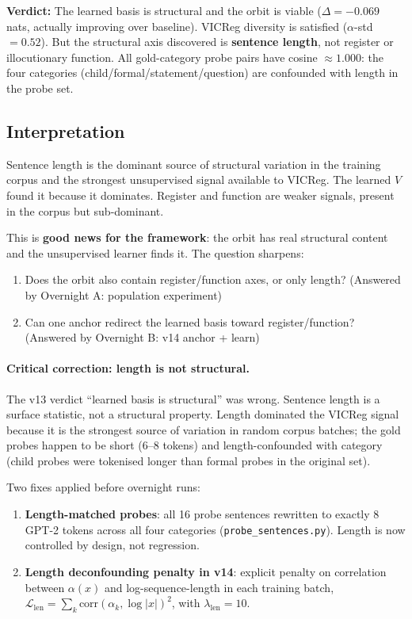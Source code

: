 \documentclass[11pt, a4paper]{article}
\theoremstyle{plain}
\theoremstyle{definition}
\theoremstyle{remark}
\begin{document}
\noindent\textbf{Verdict:} The learned basis is structural and the orbit is viable
($\Delta = -0.069$ nats, actually improving over baseline). VICReg diversity
is satisfied ($\alpha$-std $= 0.52$). But the structural axis discovered is
\textbf{sentence length}, not register or illocutionary function.
All gold-category probe pairs have cosine $\approx 1.000$: the four categories
(child/formal/statement/question) are confounded with length in the probe set.

\subsection{Interpretation}

Sentence length is the dominant source of structural variation in the training corpus
and the strongest unsupervised signal available to VICReg.
The learned $V$ found it because it dominates.
Register and function are weaker signals, present in the corpus but sub-dominant.

This is \textbf{good news for the framework}: the orbit has real structural content
and the unsupervised learner finds it. The question sharpens:
\begin{enumerate}[nosep]
\item Does the orbit also contain register/function axes, or only length?
      (Answered by Overnight A: population experiment)
\item Can one anchor redirect the learned basis toward register/function?
      (Answered by Overnight B: v14 anchor + learn)
\end{enumerate}

\paragraph{Critical correction: length is not structural.}
The v13 verdict ``learned basis is structural'' was wrong.
Sentence length is a surface statistic, not a structural property.
Length dominated the VICReg signal because it is the strongest source of variation
in random corpus batches; the gold probes happen to be short (6--8 tokens) and
length-confounded with category (child probes were tokenised longer than formal
probes in the original set).

Two fixes applied before overnight runs:
\begin{enumerate}[nosep]
\item \textbf{Length-matched probes}: all 16 probe sentences rewritten to exactly 8 GPT-2
      tokens across all four categories (\texttt{probe\_sentences.py}).
      Length is now controlled by design, not regression.
\item \textbf{Length deconfounding penalty in v14}: explicit penalty on correlation
      between $\alpha(x)$ and log-sequence-length in each training batch,
      $\mathcal{L}_{\text{len}} = \sum_k \mathrm{corr}(\alpha_k, \log|x|)^2$,
      with $\lambda_{\text{len}} = 10$.
\end{enumerate}
\end{document}
